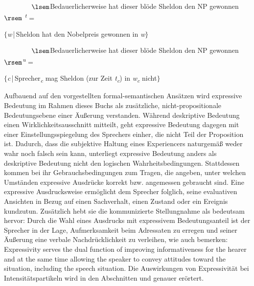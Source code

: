   \hfill \ \ \ \ \ \ \ \ $\lsem$Bedauerlicherweise hat dieser blöde Sheldon den NP gewonnen$\rsem$ \textsuperscript{\textit{t}} =

 \hfill $\lbrace${\textit{w}\,|\,Sheldon hat den Nobelpreis gewonnen in \textit{w}}$\rbrace$
 

  \hfill \ \ \ \ \ \ \ \ $\lsem$Bedauerlicherweise hat dieser blöde Sheldon den NP gewonnen$\rsem$\textsuperscript{\textit{u}} =

\hfill $\lbrace${\textit{c}\,|\,Sprecher\textsubscript{\textit{c}} mag Sheldon (zur Zeit \textit{t}\textsubscript{\textit{c}}) in \textit{w}\textsubscript{\textit{c}} nicht$\rbrace$}
\z

Aufbauend auf den vorgestellten formal-semantischen Ansätzen wird expressive Bedeutung im Rahmen dieses Buchs als zusätzliche, nicht-propositionale Bedeutungsebene einer Äußerung verstanden. Während deskriptive Bedeutung einen Wirklichkeitsausschnitt mitteilt, geht expressive Bedeutung dagegen  mit einer Einstellungsspiegelung des Sprechers einher, die nicht Teil der Proposition ist. Dadurch, dass die subjektive Haltung eines Experiencers naturgemäß weder wahr noch falsch sein kann, unterliegt expressive Bedeutung anders als deskriptive Bedeutung nicht den logischen Wahrheitsbedingungen. Stattdessen kommen bei ihr Gebrauchsbedingungen zum Tragen, die angeben, unter welchen Umständen expressive Ausdrücke korrekt bzw. angemessen gebraucht sind. Eine expressive Ausdrucksweise ermöglicht dem Sprecher folglich, seine evaluativen Ansichten in Bezug auf einen Sachverhalt, einen Zustand oder ein Ereignis kundzutun. Zusätzlich hebt sie die kommunizierte Stellungnahme als bedeutsam hervor: Durch die Wahl eines Ausdrucks mit expressivem Bedeutungsanteil ist der Sprecher in der Lage, Aufmerksamkeit beim Adressaten zu erregen und seiner Äußerung eine verbale Nachdrücklichkeit zu verleihen, wie auch {\citet[65]{Hopper.1993}} bemerken: \glqq{}Expressivity serves the dual function of improving informativeness for the hearer and at the same time allowing the speaker to convey attitudes toward the situation, including the speech situation.\grqq{} Die Auswirkungen von Expressivität bei Intensitätspartikeln wird in den Abschnitten  und  genauer erörtert.

